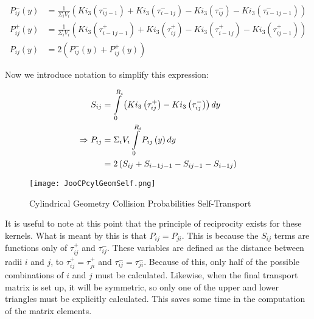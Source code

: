 \begin{subequations}\label{e:CPcylPij(y)}
  \begin{align}
  P_{ij}^-\left(y\right) &= \frac{1}{\Sigma_i V_i} \left(Ki_3\left(\tau_{ij-1}^-\right) + Ki_3\left(\tau_{i-1j}^-\right) - Ki_3\left(\tau_{ij}^-\right) - Ki_3\left(\tau_{i-1j-1}^-\right)\right) \\
  P_{ij}^+\left(y\right) &= \frac{1}{\Sigma_i V_i} \left(Ki_3\left(\tau_{i-1j-1}^+\right) + Ki_3\left(\tau_{ij}^+\right) - Ki_3\left(\tau_{i-1j}^+\right) - Ki_3\left(\tau_{ij-1}^+\right)\right) \\
  P_{ij}\left(y\right) &= 2\left(P_{ij}^-\left(y\right) + P_{ij}^+\left(y\right)\right)
  \end{align}
\end{subequations}

Now we introduce notation to simplify this expression:

\begin{subequations}\label{e:CPcypPij}
  \begin{align}
  S_{ij} &= \intop_0^{R_i} \left(Ki_3\left(\tau_{ij}^+\right) - Ki_3\left(\tau_{ij}^-\right)\right)dy \\
  \Rightarrow P_{ij} &= \Sigma_i V_i \intop_0^{R_i} P_{ij}\left(y\right)dy \nonumber \\
  &= 2\left(S_{ij} + S_{i-1j-1} - S_{ij-1} - S_{i-1j}\right)
  \end{align}
\end{subequations}

\begin{figure}
  \centering
  \texttt{[image: JooCPcylGeomSelf.png]}
  \caption{Cylindrical Geometry Collision Probabilities Self-Transport}\label{f:CPcylGeomSelf}
\end{figure}

It is useful to note at this point that the principle of reciprocity exists for these kernels.  What is meant by this is that $P_{ij} = P_{ji}$.  This is because the $S_{ij}$ terms are functions only of $\tau_{ij}^+$ and $\tau_{ij}^-$.  These variables are defined as the distance between radii $i$ and $j$, to $\tau_{ij}^+ = \tau_{ji}^+$ and $\tau_{ij}^- = \tau_{ji}^-$.  Because of this, only half of the possible combinations of $i$ and $j$ must be calculated.  Likewise, when the final transport matrix is set up, it will be symmetric, so only one of the upper and lower triangles must be explicitly calculated.  This saves some time in the computation of the matrix elements.


